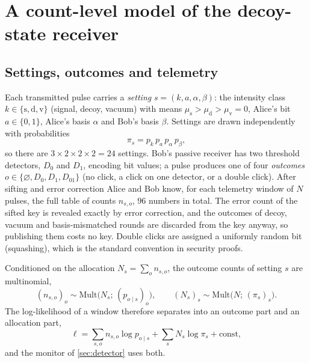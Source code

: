 \section{A count-level model of the decoy-state receiver}\label{sec:model}

\subsection{Settings, outcomes and telemetry}\label{sec:settings}

Each transmitted pulse carries a \emph{setting} $s=(k,a,\alpha,\beta)$: the intensity class $k\in\{\mathrm{s},\mathrm{d},\mathrm{v}\}$ (signal, decoy, vacuum) with means $\mu_\mathrm{s}>\mu_\mathrm{d}>\mu_\mathrm{v}=0$, Alice's bit $a\in\{0,1\}$, Alice's basis $\alpha$ and Bob's basis $\beta$. Settings are drawn independently with probabilities
\begin{equation}
\pi_s = p_k\,p_a\,p_\alpha\,p_\beta, \label{eq:settingprob}
\end{equation}
so there are $3\times2\times2\times2=24$ settings. Bob's passive receiver has two threshold detectors, $D_0$ and $D_1$, encoding bit values; a pulse produces one of four \emph{outcomes} $o\in\{\varnothing,D_0,D_1,D_{01}\}$ (no click, a click on one detector, or a double click). After sifting and error correction Alice and Bob know, for each telemetry window of $N$ pulses, the full table of counts $n_{s,o}$, 96 numbers in total. The error count of the sifted key is revealed exactly by error correction, and the outcomes of decoy, vacuum and basis-mismatched rounds are discarded from the key anyway, so publishing them costs no key. Double clicks are assigned a uniformly random bit (squashing), which is the standard convention in security proofs.

Conditioned on the allocation $N_s=\sum_o n_{s,o}$, the outcome counts of setting $s$ are multinomial,
\begin{equation}
(n_{s,o})_o \sim \mathrm{Mult}\bigl(N_s;\,(p_{o\mid s})_o\bigr), \qquad (N_s)_s \sim \mathrm{Mult}\bigl(N;\,(\pi_s)_s\bigr). \label{eq:mult}
\end{equation}
The log-likelihood of a window therefore separates into an outcome part and an allocation part,
\begin{equation}
\ell = \sum_{s,o} n_{s,o}\log p_{o\mid s} + \sum_s N_s \log \pi_s + \text{const}, \label{eq:loglik}
\end{equation}
and the monitor of \cref{sec:detector} uses both.

